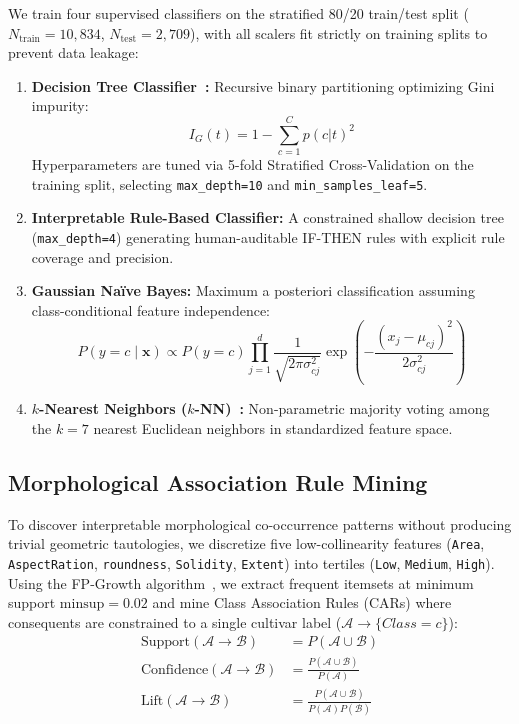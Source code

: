 \documentclass[11pt,a4paper]{article}
\begin{document}
We train four supervised classifiers on the stratified 80/20 train/test split ($N_{\text{train}} = 10{,}834$, $N_{\text{test}} = 2{,}709$), with all scalers fit strictly on training splits to prevent data leakage:
\begin{enumerate}[leftmargin=1.5em]
    \item \textbf{Decision Tree Classifier~\citep{breiman1984cart}:} Recursive binary partitioning optimizing Gini impurity:
    \begin{equation}
        I_G(t) = 1 - \sum_{c=1}^C p(c|t)^2
    \end{equation}
    Hyperparameters are tuned via 5-fold Stratified Cross-Validation on the training split, selecting \texttt{max\_depth=10} and \texttt{min\_samples\_leaf=5}.
    \item \textbf{Interpretable Rule-Based Classifier:} A constrained shallow decision tree (\texttt{max\_depth=4}) generating human-auditable IF-THEN rules with explicit rule coverage and precision.
    \item \textbf{Gaussian Naïve Bayes:} Maximum a posteriori classification assuming class-conditional feature independence:
    \begin{equation}
        P(y = c \mid \mathbf{x}) \propto P(y = c) \prod_{j=1}^d \frac{1}{\sqrt{2\pi\sigma_{cj}^2}} \exp\left(-\frac{(x_j - \mu_{cj})^2}{2\sigma_{cj}^2}\right)
    \end{equation}
    \item \textbf{$k$-Nearest Neighbors ($k$-NN)~\citep{cover1967nearest}:} Non-parametric majority voting among the $k = 7$ nearest Euclidean neighbors in standardized feature space.
\end{enumerate}

\subsection{Morphological Association Rule Mining}
\label{subsec:meth_association}

To discover interpretable morphological co-occurrence patterns without producing trivial geometric tautologies, we discretize five low-collinearity features (\texttt{Area}, \texttt{AspectRation}, \texttt{roundness}, \texttt{Solidity}, \texttt{Extent}) into tertiles (\texttt{Low}, \texttt{Medium}, \texttt{High}). Using the FP-Growth algorithm~\citep{han2000mining,raschka2018mlxtend}, we extract frequent itemsets at minimum support $\text{minsup} = 0.02$ and mine Class Association Rules (CARs) where consequents are constrained to a single cultivar label ($\mathcal{A} \to \{Class = c\}$):
\begin{align}
    \text{Support}(\mathcal{A} \to \mathcal{B}) &= P(\mathcal{A} \cup \mathcal{B}) \\
    \text{Confidence}(\mathcal{A} \to \mathcal{B}) &= \frac{P(\mathcal{A} \cup \mathcal{B})}{P(\mathcal{A})} \\
    \text{Lift}(\mathcal{A} \to \mathcal{B}) &= \frac{P(\mathcal{A} \cup \mathcal{B})}{P(\mathcal{A}) P(\mathcal{B})}
\end{align}
\end{document}
